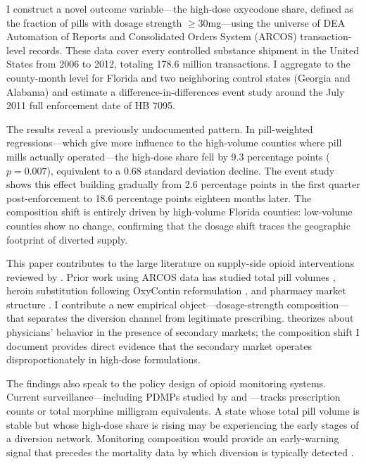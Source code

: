 \documentclass[12pt]{article}
\begin{document}
I construct a novel outcome variable---the high-dose oxycodone share, defined as the fraction of pills with dosage strength $\geq$30mg---using the universe of DEA Automation of Reports and Consolidated Orders System (ARCOS) transaction-level records. These data cover every controlled substance shipment in the United States from 2006 to 2012, totaling 178.6 million transactions. I aggregate to the county-month level for Florida and two neighboring control states (Georgia and Alabama) and estimate a difference-in-differences event study around the July 2011 full enforcement date of HB 7095.

The results reveal a previously undocumented pattern. In pill-weighted regressions---which give more influence to the high-volume counties where pill mills actually operated---the high-dose share fell by 9.3 percentage points ($p = 0.007$), equivalent to a 0.68 standard deviation decline. The event study shows this effect building gradually from 2.6 percentage points in the first quarter post-enforcement to 18.6 percentage points eighteen months later. The composition shift is entirely driven by high-volume Florida counties: low-volume counties show no change, confirming that the dosage shift traces the geographic footprint of diverted supply.

This paper contributes to the large literature on supply-side opioid interventions reviewed by \citet{maclean2022opioid}. Prior work using ARCOS data has studied total pill volumes \citep{alpert2018supply, okaneku2024tracing}, heroin substitution following OxyContin reformulation \citep{evans2019reformulation}, and pharmacy market structure \citep{burton2025supply}. I contribute a new empirical object---dosage-strength composition---that separates the diversion channel from legitimate prescribing. \citet{schnell2017physician} theorizes about physicians' behavior in the presence of secondary markets; the composition shift I document provides direct evidence that the secondary market operates disproportionately in high-dose formulations.

The findings also speak to the policy design of opioid monitoring systems. Current surveillance---including PDMPs studied by \citet{buchmueller2020pdmp} and \citet{sacks2021initiation}---tracks prescription counts or total morphine milligram equivalents. A state whose total pill volume is stable but whose high-dose share is rising may be experiencing the early stages of a diversion network. Monitoring composition would provide an early-warning signal that precedes the mortality data by which diversion is typically detected \citep{paulozzi2011vital, ruhm2019drivers}.
\end{document}
